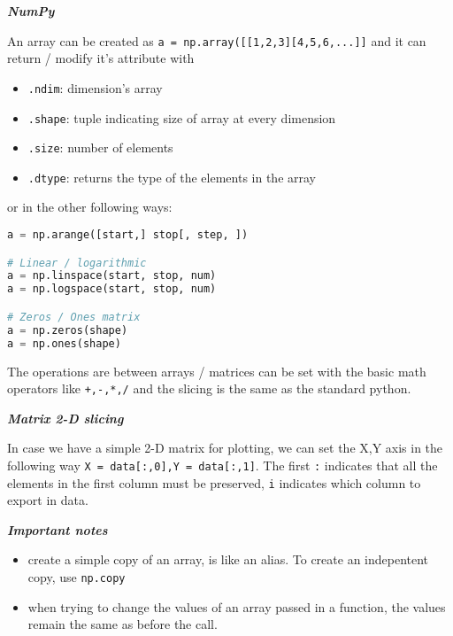 \documentclass[fontsize=8pt, a4paper, landscape, fleqn]{scrartcl}
\renewcommand{\subsubsection}[1]{%
    \noindent\textbf{\textit{\color{subsectioncolor}#1}}%
    \vspace{1mm}%
}
\begin{document}
\begin{multicols*}{3}[\raggedcolumns]
    \subsubsection{NumPy}
    An array can be created as \lstinline{a = np.array([[1,2,3][4,5,6,...]]} and it can return / modify it's attribute with
    \begin{multicols}{2}
        \begin{itemize}
            \item \lstinline{.ndim}: dimension's array
            \item \lstinline{.shape}: tuple indicating size of array at every dimension
            \item \lstinline{.size}: number of elements
            \item \lstinline{.dtype}: returns the type of the elements in the array
        \end{itemize}
    \end{multicols}
    
    or in the other following ways:
\begin{lstlisting}[language=python, breaklines]
a = np.arange([start,] stop[, step, ])

# Linear / logarithmic 
a = np.linspace(start, stop, num) 
a = np.logspace(start, stop, num)

# Zeros / Ones matrix
a = np.zeros(shape)
a = np.ones(shape) \end{lstlisting}

    The operations are between arrays / matrices can be set with the basic math operators like \lstinline{+,-,*,/} and the slicing is the same as the standard python.
    
    \subsubsection{Matrix 2-D slicing}
    In case we have a simple 2-D matrix for plotting, we can set the X,Y axis in the following way \lstinline{X = data[:,0],Y = data[:,1]}. The first \lstinline{:} indicates that all the elements in the first column must be preserved, \lstinline{i} indicates which column to export in data.

    \subsubsection{Important notes}
    \begin{itemize}
        \item create a simple copy of an array, is like an alias. To create an indepentent copy, use \lstinline{np.copy}
        \item when trying to change the values of an array passed in a function, the values remain the same as before the call.
    \end{itemize}
    

\end{multicols*}
\end{document}
